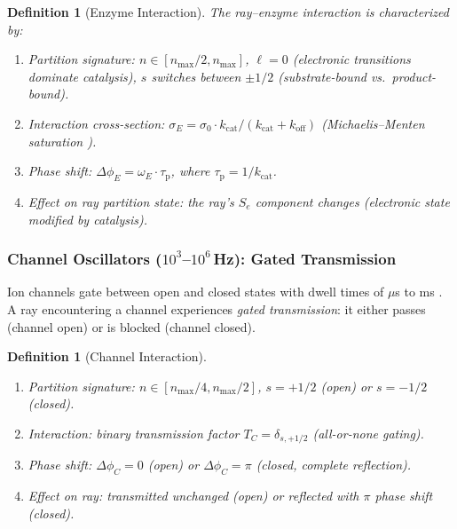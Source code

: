 \documentclass[11pt,twocolumn,a4paper]{article}
\newtheorem{definition}[theorem]{Definition}
\newcommand{\Se}{S_e}
\newcommand{\taup}{\tau_{\mathrm{p}}}
\begin{document}
\begin{definition}[Enzyme Interaction]
\label{def:enzyme-interaction}
The ray--enzyme interaction is characterized by:
\begin{enumerate}[label=(\alph*),leftmargin=*]
\item \textit{Partition signature:} $n \in [n_{\max}/2, n_{\max}]$,
  $\ell = 0$ (electronic transitions dominate catalysis), $s$ switches
  between $\pm 1/2$ (substrate-bound vs.\ product-bound).
\item \textit{Interaction cross-section:}
  $\sigma_E = \sigma_0 \cdot k_{\mathrm{cat}} /
  (k_{\mathrm{cat}} + k_{\mathrm{off}})$ (Michaelis--Menten
  saturation \citep{michaelismenten1913}).
\item \textit{Phase shift:}
  $\Delta\phi_E = \omega_E \cdot \taup$, where
  $\taup = 1/k_{\mathrm{cat}}$.
\item \textit{Effect on ray partition state:} the ray's $\Se$ component
  changes (electronic state modified by catalysis).
\end{enumerate}
\end{definition}

\subsubsection{Channel Oscillators ($10^{3}$--$10^{6}$\,Hz):
Gated Transmission}

Ion channels gate between open and closed states with dwell times of
$\mu$s to ms \citep{hille2001}. A ray encountering a channel
experiences \emph{gated transmission}: it either passes (channel open)
or is blocked (channel closed).

\begin{definition}[Channel Interaction]
\label{def:channel-interaction}
\begin{enumerate}[label=(\alph*),leftmargin=*]
\item \textit{Partition signature:} $n \in [n_{\max}/4, n_{\max}/2]$,
  $s = +1/2$ (open) or $s = -1/2$ (closed).
\item \textit{Interaction:} binary transmission factor
  $T_C = \delta_{s,+1/2}$ (all-or-none gating).
\item \textit{Phase shift:} $\Delta\phi_C = 0$ (open) or
  $\Delta\phi_C = \pi$ (closed, complete reflection).
\item \textit{Effect on ray:} transmitted unchanged (open) or
  reflected with $\pi$ phase shift (closed).
\end{enumerate}
\end{definition}
\end{document}
